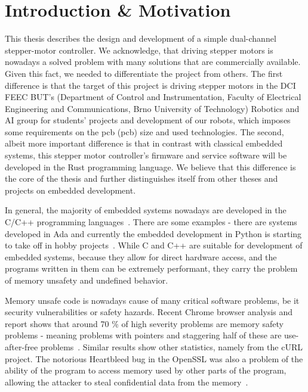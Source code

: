 \chapter*{Introduction \& Motivation}
{}
This thesis describes the design and development of a simple dual-channel stepper-motor controller.
We acknowledge, that driving stepper motors is nowadays a solved problem with many solutions that are commercially available.
Given this fact, we needed to differentiate the project from others.
The first difference is that the target of this project is driving stepper motors in the DCI FEEC BUT's (Department of Control and Instrumentation, Faculty of Electrical Engineering and Communications, Brno University of Technology) Robotics and AI group for students' projects and development of our robots, which imposes some requirements on the \acs{pcb} (\acl{pcb}) size and used technologies.
The second, albeit more important difference is that in contrast with classical embedded systems, this stepper motor controller's firmware and service software will be developed in the Rust programming language.
We believe that this difference is the core of the thesis and further distinguishes itself from other theses and projects on embedded development.

In general, the majority of embedded systems nowadays are developed in the C/C++ programming languages~\cite{cohen_tech_nodate, dubois_programming_nodate, noauthor_embedded_2021}.
There are some examples - there are systems developed in Ada and currently the embedded development in Python is starting to take off in hobby projects~\cite{circuitpython_circuitpython_2021}.
While C and C++ are suitable for development of embedded systems, because they allow for direct hardware access, and the programs written in them can be extremely performant, they carry the problem of memory unsafety and undefined behavior.

Memory unsafe code is nowadays cause of many critical software problems, be it security vulnerabilities or safety hazards.
Recent Chrome browser analysis and report shows that around 70 \% of high severity problems are memory safety problems - meaning problems with pointers and staggering half of these are use-after-free problems~\cite{chromium_projects_memory_nodate}.
Similar results show other statistics, namely from the cURL project\cite{stenberg_half_nodate}.
The notorious Heartbleed bug in the OpenSSL was also a problem of the ability of the program to access memory used by other parts of the program, allowing the attacker to steal confidential data from the memory~\cite{synopsys_heartbleed_2020}.

